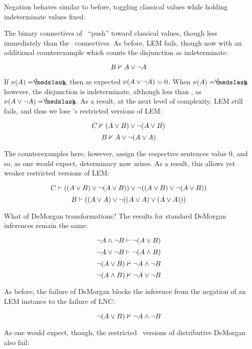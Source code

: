 \noindent Negation behaves similar to before, toggling classical values while holding indeterminate values fixed.

The binary connectives of \GoFour\ ``push'' toward classical values, though less immediately than the \GO\ connectives. As before, LEM fails, though now with an additional counterexample which counts the disjunction as indeterminate:

    \[{B}\nvdash{ A \vee \neg A}\]



\noindent If $\Val{A} = \oneThird $, then as expected $ \mathcal{\nu}({A \vee \neg A}) = 0 $. When $\Val{A} = \twoThirds$ however, the disjunction is indeterminate, although less than , as $\Val{A \vee \neg A} = \oneThird$. As a result, at the next level of complexity, LEM still fails, and thus we lose \GO's restricted versions of LEM:


    \[{C}\nvdash{ (A \vee B) \vee \neg(A \vee B) }\]
    \[{B}\nvdash{ A \vee \neg(A \vee A) }\]


\noindent The counterexamples here, however, assign the respective sentences value $0$, and so, as one would expect, determinacy now arises. As a result, this allows yet weaker restricted versions of LEM:



    \[{C}\vdash{ ((A \vee B) \vee \neg(A \vee B )) \vee \neg((A \vee B) \vee \neg(A \vee B)) } \]
    \[{B}\vdash{ ((A \vee A) \vee \neg((A \vee A) \vee (A \vee A))) } \]



What of DeMorgan transformations? The results for standard DeMorgan inferences remain the same:


    \begin{singlespace}

	    \[{ \neg A \wedge \neg B }\vdash{ \neg(A \vee B) } \]
	    \[{ \neg A \vee \neg B }\vdash{ \neg(A \wedge B) } \]
	    \[{ \neg( A \vee B ) }\nvdash{ \neg A \wedge \neg B } \]
	    \[{ \neg( A \wedge B )}\nvdash{ \neg A \vee \neg B }\]


    \end{singlespace}


\noindent As before, the failure of DeMorgan blocks the inference from the negation of an LEM instance to the failure of LNC:


    \[{\neg(A \vee B)}\nvdash{\neg A \wedge \neg B}\]



\noindent As one would expect, though, the restricted \GO\ versions of distributive DeMorgan also fail: 


